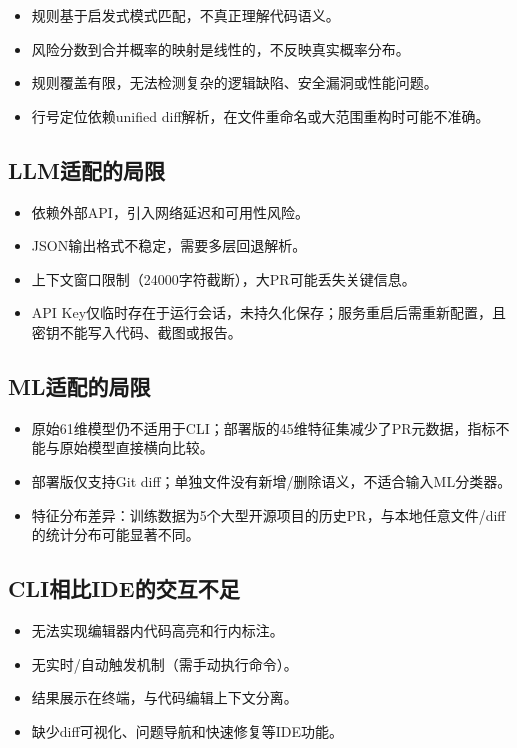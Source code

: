 \documentclass{experimentreport}
\begin{document}
\begin{itemize}
  \item 规则基于启发式模式匹配，不真正理解代码语义。
  \item 风险分数到合并概率的映射是线性的，不反映真实概率分布。
  \item 规则覆盖有限，无法检测复杂的逻辑缺陷、安全漏洞或性能问题。
  \item 行号定位依赖unified diff解析，在文件重命名或大范围重构时可能不准确。
\end{itemize}

\subsection{LLM适配的局限}

\begin{itemize}
  \item 依赖外部API，引入网络延迟和可用性风险。
  \item JSON输出格式不稳定，需要多层回退解析。
  \item 上下文窗口限制（24000字符截断），大PR可能丢失关键信息。
  \item API Key仅临时存在于运行会话，未持久化保存；服务重启后需重新配置，且密钥不能写入代码、截图或报告。
\end{itemize}

\subsection{ML适配的局限}

\begin{itemize}
  \item 原始61维模型仍不适用于CLI；部署版的45维特征集减少了PR元数据，指标不能与原始模型直接横向比较。
  \item 部署版仅支持Git diff；单独文件没有新增/删除语义，不适合输入ML分类器。
  \item 特征分布差异：训练数据为5个大型开源项目的历史PR，与本地任意文件/diff的统计分布可能显著不同。
\end{itemize}

\subsection{CLI相比IDE的交互不足}

\begin{itemize}
  \item 无法实现编辑器内代码高亮和行内标注。
  \item 无实时/自动触发机制（需手动执行命令）。
  \item 结果展示在终端，与代码编辑上下文分离。
  \item 缺少diff可视化、问题导航和快速修复等IDE功能。
\end{itemize}
\end{document}

